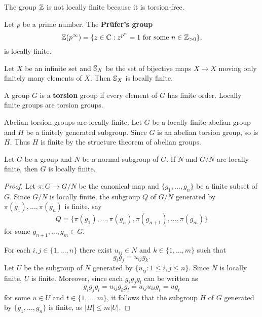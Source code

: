 \begin{example}
    The group $\mathbb{Z}$ is not locally finite because it is torsion-free.
\end{example}

\begin{example}
	Let $p$ be a prime number. 
	The \textbf{Pr\"ufer's group}  
	\[
		\mathbb{Z}(p^{\infty})=\{z\in\mathbb{C}:z^{p^n}=1\text{ for some $n\in\mathbb{Z}_{>0}$}\}, 
	\]
	is locally finite. 
\end{example}

\begin{example}
	Let $X$ be an infinite set and $\mathbb{S}_X$ be the set of bijective maps $X\to
	X$ moving only finitely many elements of $X$. Then 
	$\mathbb{S}_X$ is locally finite.
\end{example}

A group $G$ is a \textbf{torsion} group if every element of $G$
has finite order. Locally finite groups are torsion groups. 

\begin{example}
    Abelian torsion groups are locally finite. Let $G$ be a locally finite abelian group 
    and $H$ be a finitely generated subgroup. Since $G$ is an abelian torsion group, so is $H$. Thus
    $H$ is finite by the structure theorem of abelian groups. 
\end{example}

\begin{proposition}
\label{pro:exact_LI}
	Let $G$ be a group and $N$ be a normal subgroup of $G$. If $N$ and $G/N$
	are locally finite, then $G$ is locally finite.
\end{proposition}

\begin{proof}
	Let $\pi\colon G\to G/N$ be the canonical map and $\{g_1,\dots,g_n\}$ be a finite subset of $G$. 
	Since $G/N$ is locally finite, the subgroup $Q$ of $G/N$ generated by 
	$\pi(g_1),\dots,\pi(g_n)$ is finite, say
	\[
		Q=\{\pi(g_1),\dots,\pi(g_n),\pi(g_{n+1}),\dots,\pi(g_m)\}
	\]
	for some $g_{n+1},\dots,g_m\in G$. 
	
	For each $i,j\in\{1,\dots,n\}$ there exist $u_{ij}\in N$ and 
	$k\in\{1,\dots,m\}$ such that \[
	g_ig_j=u_{ij}g_k.
	\]
	Let $U$ be the subgroup of $N$
	generated by $\{u_{ij}:1\leq i,j\leq n\}$. Since $N$ is locally finite, $U$ is finite. Moreover, since 
	each $g_ig_jg_l$ can be written as 
	\[
		g_ig_jg_l=u_{ij}g_kg_l=u_{ij}u_{kl}g_t=ug_t
	\]
	for some $u\in U$ and $t\in\{1,\dots,m\}$, it follows that the subgroup 
	$H$ of $G$ generated by $\{g_1,\dots,g_n\}$ is finite, as 
	$|H|\leq m|U|$. 
\end{proof}

